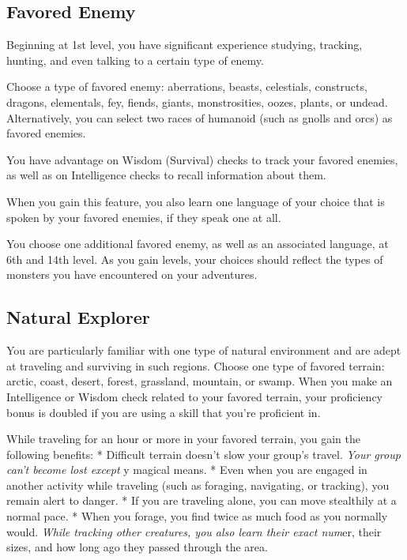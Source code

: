 \subsection{Favored Enemy}

Beginning at 1st level, you have significant experience studying, tracking, hunting, and even talking to a certain type of enemy.

Choose a type of favored enemy: aberrations, beasts, celestials, constructs, dragons, elementals, fey, fiends, giants, monstrosities, oozes, plants, or undead. Alternatively, you can select two races of humanoid (such as gnolls and orcs) as favored enemies.

You have advantage on Wisdom (Survival) checks to track your favored enemies, as well as on Intelligence checks to recall information about them.

When you gain this feature, you also learn one language of your choice that is spoken by your favored enemies, if they speak one at all.

You choose one additional favored enemy, as well as an associated language, at 6th and 14th level. As you gain levels, your choices should reflect the types of monsters you have encountered on your adventures.

\subsection{Natural Explorer}

You are particularly familiar with one type of natural environment and are adept at traveling and surviving in such regions. Choose one type of favored terrain: arctic, coast, desert, forest, grassland, mountain, or swamp. When you make an Intelligence or Wisdom check related to your favored terrain, your proficiency bonus is doubled if you are using a skill that you’re proficient in.

While traveling for an hour or more in your favored terrain, you gain the following benefits:
* Difficult terrain doesn’t slow your group’s travel.
\textit{ Your group can’t become lost except }y magical means.
* Even when you are engaged in another activity while traveling (such as foraging, navigating, or tracking), you remain alert to danger.
* If you are traveling alone, you can move stealthily at a normal pace.
* When you forage, you find twice as much food as you normally would.
\textit{ While tracking other creatures, you also learn their exact num}er, their sizes, and how long ago they passed through the area.

